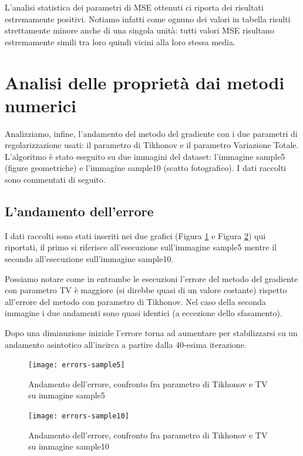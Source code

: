 \documentclass[12pt]{article}
\begin{document}
    L'analisi statistica dei parametri di MSE ottenuti ci riporta dei risultati estremamente positivi. 
    Notiamo infatti come ognuno dei valori in tabella risulti strettamente minore anche di una singola unità: tutti valori MSE risultano estremamente simili tra loro quindi vicini alla loro stessa media.
    
    \newpage

\section{Analisi delle proprietà dai metodi numerici}
    Analizziamo, infine, l'andamento del metodo del gradiente con i due parametri di regolarizzazione usati: il parametro di Tikhonov e il parametro Variazione Totale. L'algoritmo è stato eseguito su due immagini del dataset: l'immagine sample5 (figure geometriche) e l'immagine sample10 (scatto fotografico).
    I dati raccolti sono commentati di seguito.

    \subsection{L'andamento dell'errore}
    I dati raccolti sono stati inseriti nei due grafici (Figura \ref{graph:1} e Figura \ref{graph:2}) qui riportati, il primo si riferisce all'esecuzione sull'immagine sample5 mentre il secondo all'esecuzione sull'immagine sample10.

    Possiamo notare come in entrambe le esecuzioni l'errore del metodo del gradiente con parametro TV è maggiore (si direbbe quasi di un valore costante) rispetto all'errore del metodo con parametro di Tikhonov. Nel caso della seconda immagine i due andamenti sono quasi identici (a eccezione dello sfasamento).

    Dopo una diminuzione iniziale l'errore torna ad aumentare per stabilizzarsi su un andamento asintotico all'incirca a partire dalla 40-esima iterazione.

    \begin{figure}[h!]
    \centering
    \texttt{[image: errors-sample5]}
    \caption{Andamento dell'errore, confronto fra parametro di Tikhonov e TV su immagine sample5}
    \label{graph:1}
    \end{figure}

    \begin{figure}[h!]
    \centering
    \texttt{[image: errors-sample10]}
    \caption{Andamento dell'errore, confronto fra parametro di Tikhonov e TV su immagine sample10}
    \label{graph:2}
    \end{figure}
\end{document}
